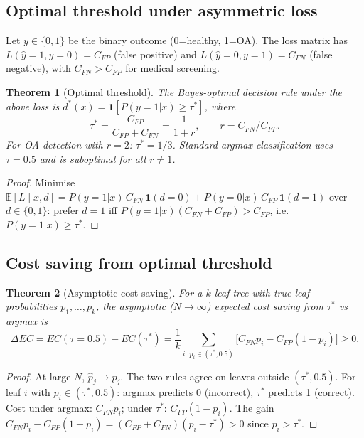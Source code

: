 \documentclass[ba,preprint]{imsart}
\theoremstyle{plain}
\newtheorem{theorem}{Theorem}
\theoremstyle{remark}
\newcommand{\Eop}{\mathbb{E}}
\begin{document}
\subsection{Optimal threshold under asymmetric loss}

Let $y \in \{0,1\}$ be the binary outcome (0=healthy, 1=OA).
The loss matrix has $L(\hat{y}=1,y=0) = C_{FP}$ (false positive)
and $L(\hat{y}=0,y=1) = C_{FN}$ (false negative), with $C_{FN} > C_{FP}$
for medical screening.

\begin{theorem}[Optimal threshold]
\label{thm:threshold}
  The Bayes-optimal decision rule under the above loss is
  $d^*(x) = \mathbf{1}[P(y=1|x) \geq \tau^*]$,
  where
  \begin{equation}
    \tau^* = \frac{C_{FP}}{C_{FP}+C_{FN}} = \frac{1}{1+r},
    \qquad r = C_{FN}/C_{FP}.
    \label{eq:tau_star}
  \end{equation}
  For OA detection with $r=2$: $\tau^* = 1/3$.
  Standard argmax classification uses $\tau=0.5$ and is suboptimal for all $r \neq 1$.
\end{theorem}

\begin{proof}
  Minimise $\Eop[L \mid x, d]
  = P(y=1|x)\,C_{FN}\,\mathbf{1}(d=0)
  + P(y=0|x)\,C_{FP}\,\mathbf{1}(d=1)$
  over $d \in \{0,1\}$: prefer $d=1$ iff
  $P(y=1|x)(C_{FN}+C_{FP}) > C_{FP}$, i.e.\ $P(y=1|x) \geq \tau^*$.
\end{proof}

\subsection{Cost saving from optimal threshold}

\begin{theorem}[Asymptotic cost saving]
\label{thm:cost_saving}
  For a $k$-leaf tree with true leaf probabilities $p_1,\ldots,p_k$,
  the asymptotic ($N\to\infty$) expected cost saving from $\tau^*$ vs argmax is
  \begin{equation}
    \Delta EC = EC(\tau=0.5) - EC(\tau^*)
    = \frac{1}{k}\sum_{i:\,p_i \in (\tau^*,0.5)}
      \bigl[C_{FN} p_i - C_{FP}(1-p_i)\bigr] \geq 0.
    \label{eq:cost_saving}
  \end{equation}
\end{theorem}

\begin{proof}
  At large $N$, $\hat{p}_j \to p_j$.
  The two rules agree on leaves outside $(\tau^*, 0.5)$.
  For leaf $i$ with $p_i \in (\tau^*, 0.5)$: argmax predicts 0 (incorrect),
  $\tau^*$ predicts 1 (correct).
  Cost under argmax: $C_{FN} p_i$; under $\tau^*$: $C_{FP}(1-p_i)$.
  The gain $C_{FN}p_i - C_{FP}(1-p_i) = (C_{FP}+C_{FN})(p_i-\tau^*) > 0$
  since $p_i > \tau^*$.
\end{proof}
\end{document}
